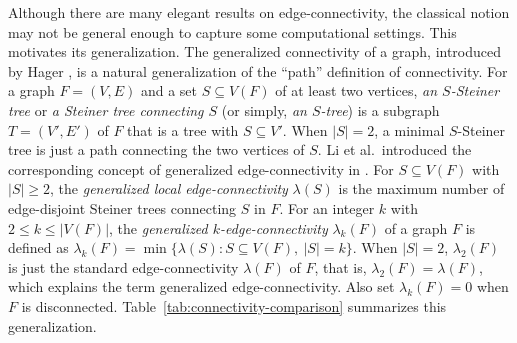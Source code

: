 \documentclass[final]{dmtcs-episciences}
\begin{document}
Although there are many elegant results on edge-connectivity, the classical
notion may not be general enough to capture some computational settings. This
motivates its generalization. The generalized connectivity of a graph,
introduced by Hager \cite{Hager}, is a natural generalization of the ``path''
definition of connectivity. For a graph
$F=(V,E)$ and a set $S\subseteq V(F)$ of at least two vertices,
\emph{an $S$-Steiner tree} or \emph{a Steiner tree connecting $S$}
(or simply, \emph{an $S$-tree}) is a subgraph $T=(V',E')$ of $F$
that is a tree with $S\subseteq V'$. When $|S|=2$, a minimal
$S$-Steiner tree is just a path connecting the two vertices of $S$.
Li et al.\ introduced the corresponding concept of generalized
edge-connectivity in \cite{LMS}. For $S\subseteq V(F)$ with $|S|\geq 2$, the \emph{generalized local edge-connectivity} $\lambda(S)$ is the maximum
number of edge-disjoint Steiner trees connecting $S$ in $F$. For an
integer $k$ with $2\leq k\leq |V(F)|$, the \emph{generalized
$k$-edge-connectivity} $\lambda_k(F)$ of a graph $F$ is defined as
$\lambda_k(F)=\min\{\lambda(S):S\subseteq V(F),\ |S|=k\}$.
When $|S|=2$, $\lambda_2(F)$ is just the standard edge-connectivity
$\lambda(F)$ of $F$, that is, $\lambda_2(F)=\lambda(F)$, which explains the term generalized edge-connectivity. Also set $\lambda_k(F)=0$ when $F$ is
disconnected. Table~\ref{tab:connectivity-comparison} summarizes this generalization.
\begin{table}[!h]
\centering
\small
{}
\caption{Classical edge-connectivity and generalized edge-connectivity.}
\label{tab:connectivity-comparison}
\end{table}
\end{document}
